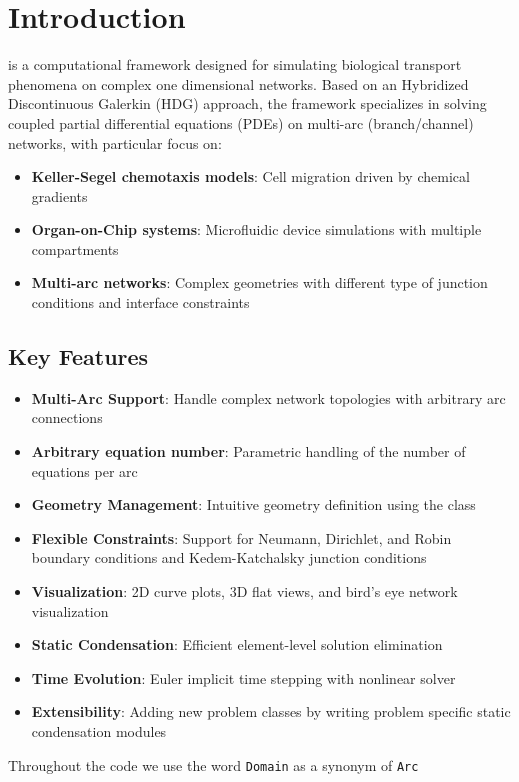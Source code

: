 \section{Introduction}

\bionetflux{} is a computational framework designed for simulating biological transport phenomena on complex one dimensional networks. Based on an Hybridized Discontinuous Galerkin (HDG) approach, the framework specializes in solving coupled partial differential equations (PDEs) on multi-arc (branch/channel) networks, with particular focus on:

\begin{itemize}
    \item \textbf{Keller-Segel chemotaxis models}: Cell migration driven by chemical gradients
    \item \textbf{Organ-on-Chip systems}: Microfluidic device simulations with multiple compartments
    \item \textbf{Multi-arc networks}: Complex geometries with different type of junction conditions and interface constraints
\end{itemize}

\subsection{Key Features}

\begin{itemize}
    \item \textbf{Multi-Arc Support}: Handle complex network topologies with arbitrary arc connections
    \item \textbf{Arbitrary equation number}: Parametric handling of the number of equations per arc
    \item \textbf{Geometry Management}: Intuitive geometry definition using the  class
    \item \textbf{Flexible Constraints}: Support for Neumann, Dirichlet, and Robin boundary conditions and  Kedem-Katchalsky junction conditions
    \item \textbf{Visualization}: 2D curve plots, 3D flat views, and bird's eye network visualization
    \item \textbf{Static Condensation}: Efficient element-level solution elimination
    \item \textbf{Time Evolution}: Euler implicit time stepping with nonlinear solver
   \item \textbf{Extensibility}: Adding new problem classes by writing problem specific static condensation modules 
\end{itemize}

\begin{warningbox}
	Throughout the code we use the word {\tt Domain} as a synonym of {\tt Arc}
\end{warningbox}
